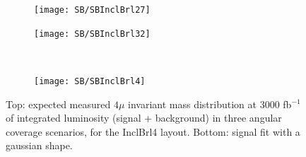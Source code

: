 \documentclass[a4paper,twoside,12pt]{book}
\begin{document}
\begin{figure}
\begin{subfigure}{.5\linewidth}
\texttt{[image: SB/SBInclBrl27]}
\caption{}
\label{fig:SBInclBrl27}
\end{subfigure}
\begin{subfigure}{.5\linewidth}
\centering
\texttt{[image: SB/SBInclBrl32]}
\caption{}
\label{fig:SBInclBrl32}
\end{subfigure}\\[1ex]
\begin{subfigure}{\linewidth}
\centering
\texttt{[image: SB/SBInclBrl4]}
\caption{}
\label{fig:SBInclBrl4}
\end{subfigure}
\caption{Top: expected measured $4\mu$ invariant mass distribution at 3000 fb$^{-1}$ of integrated luminosity (signal + background) in
	three angular coverage scenarios, for the InclBrl4 layout. Bottom: signal fit with a gaussian shape.	 }
\label{fig:SB}
\end{figure}
\end{document}
